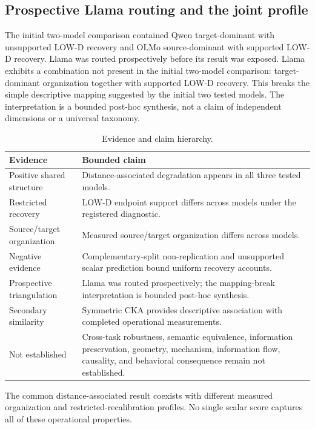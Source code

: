 \documentclass{article}
\begin{document}
\subsection{Prospective Llama routing and the joint profile}
The initial two-model comparison contained Qwen target-dominant with unsupported LOW-D recovery and OLMo source-dominant with supported LOW-D recovery. Llama was routed prospectively before its result was exposed. Llama exhibits a combination not present in the initial two-model comparison: target-dominant organization together with supported LOW-D recovery. This breaks the simple descriptive mapping suggested by the initial two tested models. The interpretation is a bounded post-hoc synthesis, not a claim of independent dimensions or a universal taxonomy.

\begin{table}[t]
\centering
\caption{Evidence and claim hierarchy.}
\begin{tabular}{p{.22\linewidth}p{.70\linewidth}}
\toprule
Evidence & Bounded claim\\
\midrule
Positive shared structure & Distance-associated degradation appears in all three tested models.\\
Restricted recovery & LOW-D endpoint support differs across models under the registered diagnostic.\\
Source/target organization & Measured source/target organization differs across models.\\
Negative evidence & Complementary-split non-replication and unsupported scalar prediction bound uniform recovery accounts.\\
Prospective triangulation & Llama was routed prospectively; the mapping-break interpretation is bounded post-hoc synthesis.\\
Secondary similarity & Symmetric CKA provides descriptive association with completed operational measurements.\\
Not established & Cross-task robustness, semantic equivalence, information preservation, geometry, mechanism, information flow, causality, and behavioral consequence remain not established.\\
\bottomrule
\end{tabular}
\end{table}

The common distance-associated result coexists with different measured organization and restricted-recalibration profiles. No single scalar score captures all of these operational properties.
\end{document}
